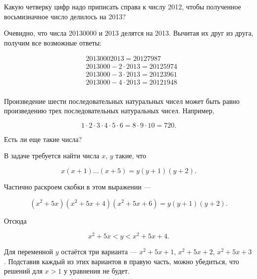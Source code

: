 \begin{itemize}

\itA Какую четверку цифр надо приписать справа к числу 2012, чтобы полученное восьмизначное число делилось на 2013?

\itr Очевидно, что числа 20130000 и 2013 делятся на 2013. Вычитая их друг из друга, получим все возможные ответы:

\begin{align*}
	& 2013000 2013 = 20127987 \\
	& 2013000 - 2 \cdot 2013 = 20125974 \\
	& 2013000 - 3 \cdot 2013 = 20123961 \\
	& 2013000 - 4 \cdot 2013 = 20121948 \\
\end{align*}

\itC Произведение шести последовательных натуральных чисел может быть равно произведению трех последовательных натуральных чисел. Например,

$$1\cdot 2\cdot 3\cdot 4\cdot 5\cdot 6=8\cdot 9\cdot 10=720.$$

Есть ли еще такие числа?

\itr В задаче требуется найти числа $x$, $y$ такие, что

\vspace{-0.4cm}
$$x(x+1)\ldots(x+5) = y(y+1)(y+2).$$

Частично раскроем скобки в этом выражении — 

\vspace{-0.4cm}
$$(x^2 + 5x)(x^2 + 5x + 4)(x^2 + 5x + 6) = y(y + 1)(y + 2).$$

Отсюда

\vspace{-0.4cm}
$$x^2+5x<y<x^2+5x+4.$$

Для переменной $y$ остаётся три варианта — $x^2+5x+1$, $x^2+5x+2$, $x^2+5x+3$. Подставив каждый из этих вариантов в правую часть, можно убедиться, что решений для $x>1$ у уравнения не будет.

\end{itemize}



